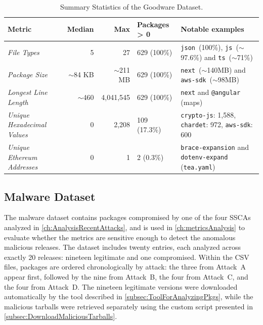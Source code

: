 \begin{table}[htb]
\centering
\footnotesize
\setlength{\tabcolsep}{4pt}
\caption{Summary Statistics of the Goodware Dataset.}
\label{tab:goodware-stats}
\begin{tabularx}{\textwidth}{@{} l r r l X @{}}
\toprule
\textbf{Metric} & \textbf{Median} & \textbf{Max} & \textbf{Packages > 0} & \textbf{Notable examples} \\
\midrule
\emph{File Types} & 5 & 27 & 629 (100\%) & \texttt{json}~(100\%), \texttt{js}~($\sim$97.6\%) and \texttt{ts}~($\sim$71\%) \\ \addlinespace
\emph{Package Size} & $\sim$84 KB & $\sim$211 MB & 629 (100\%) & \texttt{next}~($\sim$140MB) and \texttt{aws-sdk}~($\sim$98MB) \\ \addlinespace
\emph{Longest Line Length} & $\sim$460 & 4,041,545 & 629 (100\%) & \texttt{next} and \texttt{@angular} (maps) \\ \addlinespace
\emph{Unique Hexadecimal Values} & 0 & 2,208 & 109 (17.3\%) & \texttt{crypto-js}: 1,588, \texttt{chardet}: 972, \texttt{aws-sdk}: 600 \\ \addlinespace
\emph{Unique Ethereum Addresses} & 0 & 1 & 2 (0.3\%) & \texttt{brace-expansion} and \texttt{dotenv-expand} (\texttt{tea.yaml}) \\
\bottomrule
\end{tabularx}
\end{table}

\subsection{Malware Dataset}
\label{subsec:malwareDataset}

The malware dataset contains packages compromised by one of the four \acp{SSCA} analyzed in \cref{ch:AnalysisRecentAttacks},
and is used in \cref{ch:metricsAnalysis} to evaluate whether the metrics are sensitive enough to detect the anomalous malicious releases.
The dataset includes twenty entries, each analyzed across exactly 20 releases: nineteen legitimate and one compromised.
Within the CSV files, packages are ordered chronologically by attack: the three from Attack~A appear first,
followed by the nine from Attack~B, the four from Attack~C, and the four from Attack~D.
The nineteen legitimate versions were downloaded automatically by the tool described in \cref{subsec:ToolForAnalyzingPkgs},
while the malicious tarballs were retrieved separately using the custom script presented in \cref{subsec:DownloadMaliciousTarballs}.


